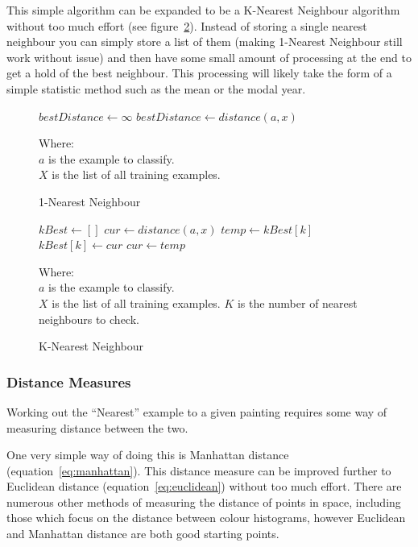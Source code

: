 \documentclass[11pt,fleqn,twoside]{article}
\begin{document}
This simple algorithm can be expanded to be a K-Nearest Neighbour algorithm without too much effort
(see figure~\ref{fig:k-nn}). Instead of storing a single nearest neighbour you can simply store a
list of them (making 1-Nearest Neighbour still work without issue) and then have some small amount
of processing at the end to get a hold of the best neighbour. This processing will likely take the
form of a simple statistic method such as the mean or the modal year.

\begin{figure}[h]
\begin{algorithmic}
\State $bestDistance \gets \infty$
		\State $bestDistance \gets distance(a, x)$
	\EndIf
\EndFor
\end{algorithmic}

Where:\\
\(a\) is the example to classify.\\
\(X\) is the list of all training examples.
\caption{1-Nearest Neighbour}
\label{fig:1-nn}
\end{figure}

\begin{figure}[h]
\begin{algorithmic}
\State $kBest \gets []$
	\State $cur \gets distance(a, x)$
			\State $temp \gets kBest[k]$
			\State $kBest[k] \gets cur$
			\State $cur \gets temp$
		\EndIf
	\EndFor
\EndFor
\end{algorithmic}
Where:\\
$a$ is the example to classify.\\
$X$ is the list of all training examples.
$K$ is the number of nearest neighbours to check.
\caption{K-Nearest Neighbour}
\label{fig:k-nn}
\end{figure}


\subsubsection{Distance Measures}
Working out the ``Nearest'' example to a given painting requires some way of measuring distance
between the two.

One very simple way of doing this is Manhattan distance (equation~\ref{eq:manhattan}). This distance
measure can be improved further to Euclidean distance (equation~\ref{eq:euclidean}) without too much
effort. There are numerous other methods of measuring the distance of points in space, including
those which focus on the distance between colour histograms, however Euclidean and Manhattan 
distance are both good starting points.
\end{document}
